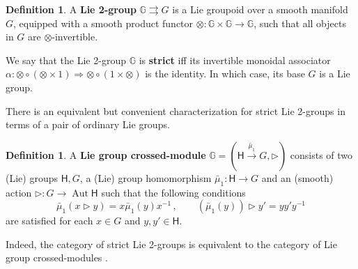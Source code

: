 \documentclass[11pt]{amsart}
\numberwithin{equation}{section}
\numberwithin{figure}{section}
\numberwithin{table}{section}
\theoremstyle{thm}
\numberwithin{equation}{subsection}
\theoremstyle{definition}
\newtheorem{dfn}[theorem]{Definition}
\theoremstyle{rem}
\begin{document}
\begin{dfn}
    A \textbf{Lie 2-group} $\mathbb{G} \rightrightarrows G$ is a Lie groupoid over a smooth manifold $G$, equipped with a smooth product functor $\otimes: \mathbb{G}\times \mathbb{G}\to \mathbb{G}$, such that all objects in $G$ are $\otimes$-invertible. 
\end{dfn}
We say that the Lie 2-group $\mathbb{G}$ is \textbf{strict} iff its invertible monoidal associator $\alpha: \otimes \circ (\otimes \times 1) \Rightarrow \otimes\circ (1\times\otimes)$ is the identity. In which case, its base $G$ is a Lie group.

There is an equivalent but convenient characterization for strict Lie 2-groups in terms of a pair of ordinary Lie groups. 
\begin{dfn}
\label{2grpdef}
A {\bf Lie group crossed-module} $\mathbb{G}=(\mathsf{H}\xrightarrow{\bar\mu_1}G,\rhd)$ consists of two (Lie) groups $\mathsf{H},G$, a (Lie) group homomorphism $\bar\mu_1:\mathsf{H}\rightarrow G$ and an (smooth) action $\rhd:G\rightarrow \operatorname{Aut}\mathsf{H}$ such that the following conditions
\begin{equation}
    \bar\mu_1(x\rhd y) = x\bar\mu_1(y)x^{-1}\,,\qquad (\bar\mu_1(y))\rhd y'=yy'y^{-1}\label{pfeif2}
\end{equation}
are satisfied for each $x\in G$ and $y,y'\in \mathsf{H}$.
\end{dfn}
\noindent Indeed, the category of strict Lie 2-groups is equivalent to the category of Lie group crossed-modules \cite{Porst2008Strict2A}.

\medskip
\end{document}
